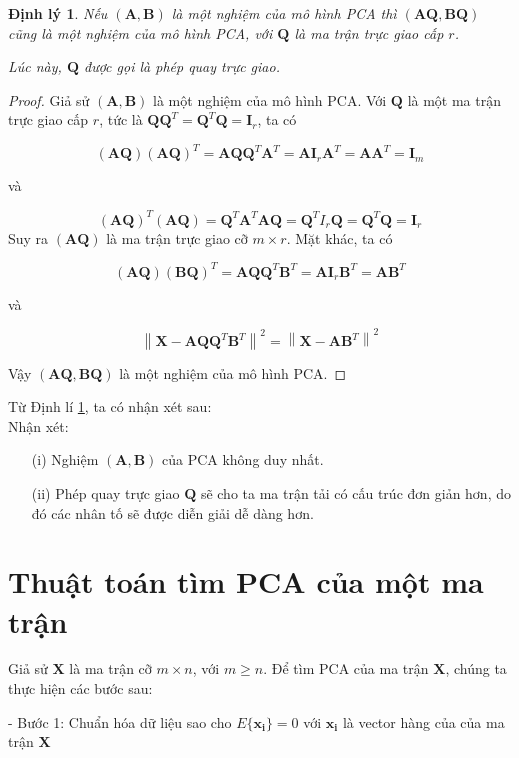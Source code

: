 \documentclass[14pt,oneside,a4paper]{report}
\newtheorem{dl}{Định lý}[section]
\numberwithin{equation}{section}
\begin{document}
\begin{dl} \label{dl351}
Nếu $(\mathbf{A, B})$ là một nghiệm của mô hình PCA thì $(\mathbf{A Q, B Q})$ cũng là một nghiệm của mô hình PCA, với $\mathbf{Q}$ là ma trận trực giao cấp $r$.

Lúc này, $\mathbf{Q}$ được gọi là phép quay trực giao.
\end{dl}
\begin{proof}
Giả sử $(\mathbf{A, B})$ là một nghiệm của mô hình PCA.
Với $\mathbf{Q}$ là một ma trận trực giao cấp $r$, tức là $\mathbf{Q Q}^{T}=\mathbf{Q}^{T} \mathbf{Q}=\mathbf{I}_{r}$, ta có

$$
(\mathbf{A Q})(\mathbf{A Q})^{T}=\mathbf{A Q Q}^{T} \mathbf{A}^{T}=\mathbf{AI}_{r} \mathbf{A}^{T}=\mathbf{A A}^{T}=\mathbf{I}_{m}
$$

và

$$
(\mathbf{A Q})^{T}(\mathbf{A Q})=\mathbf{Q}^{T} \mathbf{A}^{T} \mathbf{A Q}=\mathbf{Q}^{T} I_{r} \mathbf{Q}=\mathbf{Q}^{T} \mathbf{Q}=\mathbf{I}_{r}
$$
Suy ra $(\mathbf{A Q})$ là ma trận trực giao cỡ $m \times r$.
Mặt khác, ta có

$$
(\mathbf{A Q})(\mathbf{B Q})^{T}=\mathbf{A Q Q}^{T} \mathbf{B}^{T}=\mathbf{A I}_{r} \mathbf{B}^{T}=\mathbf{A B}^{T}
$$

và

$$
\left\|\mathbf{X-A Q Q}^{T} \mathbf{B}^{T}\right\|^{2}=\left\|\mathbf{X-A B}^{T}\right\|^{2}
$$

Vậy $(\mathbf{A Q, B Q})$ là một nghiệm của mô hình PCA.
\end{proof}
Từ Định lí \ref{dl351}, ta có nhận xét sau:\\
Nhận xét: 
\begin{itemize}
\item[(i)] Nghiệm $(\mathbf{A, B})$ của PCA không duy nhất.
\item[(ii)] Phép quay trực giao $\mathbf{Q}$ sẽ cho ta ma trận tải có cấu trúc đơn giản hơn, do đó các nhân tố sẽ được diễn giải dễ dàng hơn.
\end{itemize}
\section{Thuật toán tìm PCA của một ma trận}

Giả sử $\mathbf{X}$ là ma trận cỡ $m \times n$, với $m \geq n$. Để tìm $\mathrm{PCA}$ của ma trận $\mathbf{X}$, chúng ta thực hiện các bước sau:

- Bước 1: Chuẩn hóa dữ liệu sao cho $E\{\mathbf{x_i}\}=0$ với $\mathbf{x_i}$ là vector hàng của của ma trận $\mathbf{X}$
\end{document}
